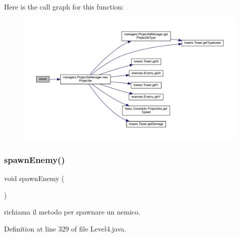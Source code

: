 Here is the call graph for this function\+:\nopagebreak
\begin{figure}[H]
\begin{center}
\leavevmode
\includegraphics[width=350pt]{classscenes_1_1_level4_a200b073564fc341f34b6112718742bae_cgraph}
\end{center}
\end{figure}
\mbox{\label{classscenes_1_1_level4_addfc0c3129b6ff606f7276e175f31a15}} 
\subsubsection{\texorpdfstring{spawn\+Enemy()}{spawnEnemy()}}
{\footnotesize\ttfamily void spawn\+Enemy (\begin{DoxyParamCaption}{ }\end{DoxyParamCaption})\hspace{0.3cm}{\ttfamily [private]}}



richiama il metodo per spawnare un nemico. 



Definition at line 329 of file Level4.\+java.

